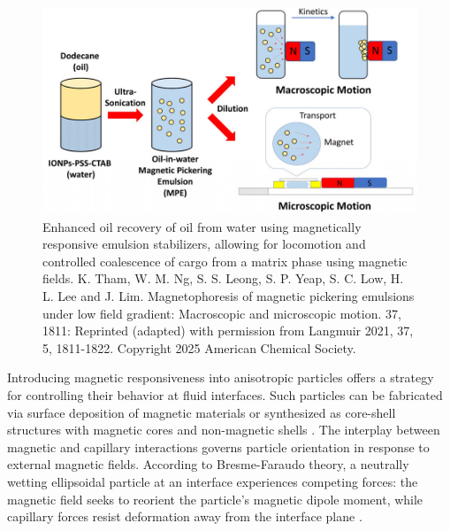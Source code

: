 \begin{figure}
    \centering
    \includegraphics[scale = 1.5]{figures/introduction/magnetophoresis_emulsion.jpeg}
    \caption{Enhanced oil recovery of oil from water using magnetically responsive emulsion stabilizers, allowing for 
             locomotion and controlled coalescence of cargo from a matrix phase using magnetic fields. \cite{tham_magnetophoresis_2021} 
             K. Tham, W. M. Ng, S. S. Leong, S. P. Yeap, S. C. Low, H. L. Lee and J. Lim. Magnetophoresis of magnetic pickering 
             emulsions under low field gradient: Macroscopic and microscopic motion. 37, 1811: Reprinted (adapted) with permission from 
             Langmuir 2021, 37, 5, 1811-1822. Copyright 2025 American Chemical Society.}
    \label{fig:magnetophoresis_droplet}
\end{figure}

Introducing magnetic responsiveness into anisotropic particles offers a strategy for controlling their behavior at fluid interfaces. Such particles can be fabricated via surface deposition of 
magnetic materials or synthesized as core-shell structures with magnetic cores and non-magnetic shells \cite{fei_magneto-capillary_2020, nakayama_stimuli-responsive_2018}. The interplay between magnetic 
and capillary interactions governs particle orientation in response to external magnetic fields. According to Bresme-Faraudo theory, a neutrally wetting ellipsoidal particle at an interface experiences 
competing forces: the magnetic field seeks to reorient the particle's magnetic dipole moment, while capillary forces resist deformation away from the interface plane 
\cite{bresme_orientational_2007, davies_interface_2014}.

